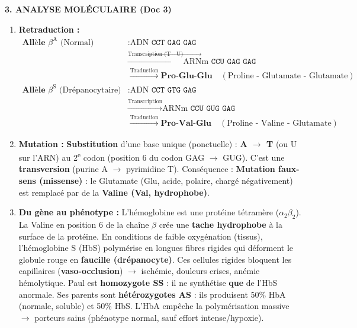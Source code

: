 \documentclass[11pt]{article}
\begin{document}
\begin{exoresolu}
\textbf{3. ANALYSE MOLÉCULAIRE (Doc 3)}
\begin{enumerate}
\item \textbf{Retraduction :}
\begin{align*}
\textbf{Allèle } \beta^{\text{A}} \text{ (Normal)} &: \text{ADN } \texttt{CCT GAG GAG} \\
&\xrightarrow{\text{Transcription (T$\to$U)}} \text{ARNm } \texttt{CCU GAG GAG} \\
&\xrightarrow{\text{Traduction}} \textbf{Pro-Glu-Glu} \quad (\text{Proline - Glutamate - Glutamate}) \\[6pt]
\textbf{Allèle } \beta^{\text{S}} \text{ (Drépanocytaire)} &: \text{ADN } \texttt{CCT GTG GAG} \\
&\xrightarrow{\text{Transcription}} \text{ARNm } \texttt{CCU GUG GAG} \\
&\xrightarrow{\text{Traduction}} \textbf{Pro-Val-Glu} \quad (\text{Proline - Valine - Glutamate})
\end{align*}
\item \textbf{Mutation :} \textbf{Substitution} d'une base unique (ponctuelle) : \textbf{A $\to$ T} (ou U sur l'ARN) au 2\textsuperscript{e} codon (position 6 du codon GAG $\to$ GUG). C'est une \textbf{transversion} (purine A $\to$ pyrimidine T). Conséquence : \textbf{Mutation faux-sens (missense)} : le Glutamate (Glu, acide, polaire, chargé négativement) est remplacé par de la \textbf{Valine (Val, hydrophobe)}.
\item \textbf{Du gène au phénotype :} L'hémoglobine est une protéine tétramère ($\alpha_2\beta_2$). La Valine en position 6 de la chaîne $\beta$ crée une \textbf{tache hydrophobe} à la surface de la protéine. En conditions de faible oxygénation (tissus), l'hémoglobine S (HbS) polymérise en longues fibres rigides qui déforment le globule rouge en \textbf{faucille (drépanocyte)}. Ces cellules rigides bloquent les capillaires (\textbf{vaso-occlusion}) $\to$ ischémie, douleurs crises, anémie hémolytique. Paul est \textbf{homozygote SS} : il ne synthétise \textbf{que} de l'HbS anormale. Ses parents sont \textbf{hétérozygotes AS} : ils produisent 50\% HbA (normale, soluble) et 50\% HbS. L'HbA empêche la polymérisation massive $\to$ porteurs sains (phénotype normal, sauf effort intense/hypoxie).
\end{enumerate}


\end{exoresolu}
\end{document}
